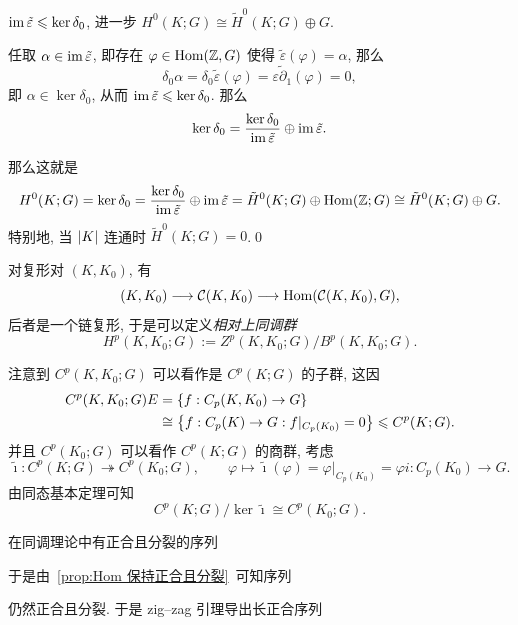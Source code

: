 \begin{Proposition}
	$ \mathrm{im}\,\tilde{\varepsilon}\leqslant\ker\delta_0 $, 进一步 $ H^0(K;G)\cong\tilde{H}^0(K;G)\oplus G $.
\end{Proposition}
\begin{Proof}
	任取 $ \alpha\in\mathrm{im}\,\tilde{\varepsilon} $, 即存在 $ \varphi\in\mathrm{Hom}(\mathbb{Z},G) $ 使得 $ \tilde{\varepsilon}(\varphi)=\alpha $, 那么
	\[
		\delta_0\alpha=\delta_0\tilde{\varepsilon}(\varphi)=\widetilde{\varepsilon\partial_1}(\varphi)=0,
	\]
	即 $ \alpha\in\ker\delta_0 $, 从而 $ \mathrm{im}\,\tilde{\varepsilon}\leqslant\ker\delta_0 $. 那么
	\[
		\ker\delta_0=\frac{\ker\delta_0}{\mathrm{im}\,\tilde{\varepsilon}}\oplus\mathrm{im}\,\tilde{\varepsilon}.
	\]

	那么这就是
	\[
		H^0(K;G)=\ker\delta_0=\frac{\ker\delta_0}{\mathrm{im}\,\tilde{\varepsilon}}\oplus\mathrm{im}\,\tilde{\varepsilon}=\tilde{H}^0(K;G)\oplus\mathrm{Hom}(\mathbb{Z};G)\cong\tilde{H}^0(K;G)\oplus G.
	\]
	特别地, 当 $ \left| K \right|  $ 连通时 $ \tilde{H}^0(K;G)=0 $.\qed
\end{Proof}

对复形对 $ (K,K_0) $, 有
\[
	(K,K_0)\longrightarrow \mathcal{C}(K,K_0)\longrightarrow \mathrm{Hom}(\mathcal{C}(K,K_0),G),
\]
后者是一个链复形, 于是可以定义\emph{相对上同调群}
\[
	H^p(K,K_0;G):=Z^p(K,K_0;G)/B^p(K,K_0;G).
\]

注意到 $ C^p(K,K_0;G) $ 可以看作是 $ C^p(K;G) $ 的子群, 这因
\[
	\begin{aligned}
		C^p(K,K_0;G)E&=\left\{ f : C_p(K,K_0)\to G \right\}\\
		&\cong\left\{ f : C_p(K)\to G : f|_{C_p(K_0)}=0 \right\}\leqslant C^p(K;G).
	\end{aligned}
\]
并且 $ C^p(K_0;G) $ 可以看作 $ C^p(K;G) $ 的商群, 考虑
\[
	\tilde{\imath} : C^p(K;G)\twoheadrightarrow C^p(K_0;G),\qquad \varphi\mapsto\tilde{\imath}(\varphi)=\varphi|_{C_p(K_0)}=\varphi i : C_p(K_0)\to G.
\]
由同态基本定理可知
\[
	C^p(K;G)/\ker\tilde{\imath}\cong C^p(K_0;G).
\]

在同调理论中有正合且分裂的序列
\begin{center}
\end{center}
于是由~\ref{prop:Hom 保持正合且分裂}~可知序列
\begin{center}
\end{center}
仍然正合且分裂. 于是 zig--zag 引理导出长正合序列
\begin{center}
\end{center}

